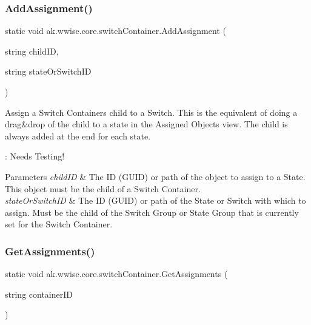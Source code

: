 \subsubsection{\texorpdfstring{Add\+Assignment()}{AddAssignment()}}
{\footnotesize\ttfamily static void ak.\+wwise.\+core.\+switch\+Container.\+Add\+Assignment (\begin{DoxyParamCaption}\item[{string}]{child\+ID,  }\item[{string}]{state\+Or\+Switch\+ID }\end{DoxyParamCaption})\hspace{0.3cm}{\ttfamily [static]}}



Assign a Switch Container\textquotesingle{}s child to a Switch. This is the equivalent of doing a drag\&drop of the child to a state in the Assigned Objects view. The child is always added at the end for each state. 

\+: Needs Testing!


\begin{DoxyParams}{Parameters}
{\em child\+ID} & The ID (G\+U\+ID) or path of the object to assign to a State. This object must be the child of a Switch Container.\\
\hline
{\em state\+Or\+Switch\+ID} & The ID (G\+U\+ID) or path of the State or Switch with which to assign. Must be the child of the Switch Group or State Group that is currently set for the Switch Container.\\
\hline
\end{DoxyParams}
\mbox{\label{classak_1_1wwise_1_1core_1_1switch_container_acb318b35c61f65b8b09466294e44ef52}} 
\subsubsection{\texorpdfstring{Get\+Assignments()}{GetAssignments()}}
{\footnotesize\ttfamily static void ak.\+wwise.\+core.\+switch\+Container.\+Get\+Assignments (\begin{DoxyParamCaption}\item[{string}]{container\+ID }\end{DoxyParamCaption})\hspace{0.3cm}{\ttfamily [static]}}



